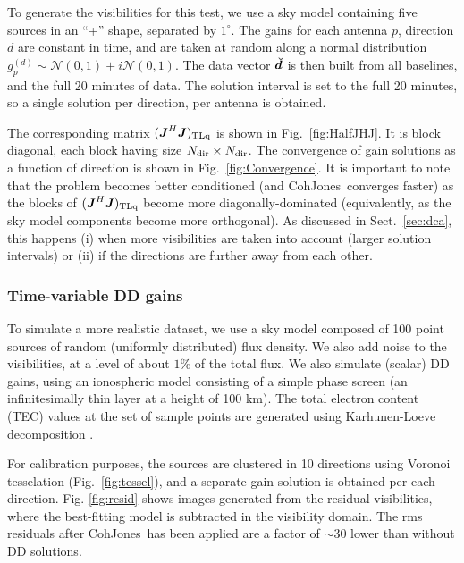 \documentclass[useAMS,usenatbib]{mn2e}
\newcommand{\mat}[1]{{\bmath{#1}}}
\newcommand{\JJ}{\mat{J}} %
\newcommand{\JHJ}{\JJ^H\JJ} %
\newcommand{\COH}{{\sc CohJones}}
\begin{document}
To generate the visibilities for this test, we use a sky model containing five
sources in an ``+'' shape, separated by $1^\circ$. The gains
for each antenna $p$, direction $d$ are
constant in time, and are taken at random along a normal distribution
$g^{(d)}_{p}\sim\mathcal{N}\left(0,1\right)+i\mathcal{N}\left(0,1\right)$. The
data vector $\Dd$ is then built from all baselines, and the full $20$ minutes of data.
The solution interval is set to the full 20 minutes, so a single solution per direction, per antenna is 
obtained.

The corresponding matrix $(\JHJ)_\UL$ is shown in Fig.~\ref{fig:HalfJHJ}. It is block diagonal, each block having size
$N_\mathrm{dir}\times N_\mathrm{dir}$. The convergence of gain solutions as a function of direction is shown in Fig.~\ref{fig:Convergence}. 
It is important to note that the problem becomes better conditioned (and \COH\ converges faster) 
as the blocks of $(\JHJ)_\UL$ become more diagonally-dominated (equivalently, as the sky model components
become more orthogonal). As discussed in Sect.~\ref{sec:dca}, this happens (i) when more visibilities are taken into account (larger solution intervals) or (ii) if the directions are further away from each other.

\subsubsection{Time-variable DD gains}
\label{sec:VarSimul}

To simulate a more realistic dataset, we use a sky model composed of 100 point sources of random (uniformly distributed) flux density. We also add noise to the visibilities, at a level of about $1\%$ of the total flux. We also simulate
(scalar) DD gains, using an ionospheric model consisting of a simple phase screen (an infinitesimally thin layer at a height of 100 km). The total electron content (TEC) values at the set of sample points are generated using Karhunen-Loeve decomposition \citep[the spatial correlation is given by Kolmogorov turbulence, see][]{Tol09}. 

For calibration purposes, the sources are clustered in 10 directions using Voronoi tesselation (Fig.~\ref{fig:tessel}),
and a separate gain solution is obtained per each direction. Fig. \ref{fig:resid} shows images generated from
the residual visibilities, where the best-fitting model is subtracted in the visibility domain.  The rms residuals
after \COH\ has been applied are a factor of $\sim30$ lower than without DD solutions.
\end{document}
